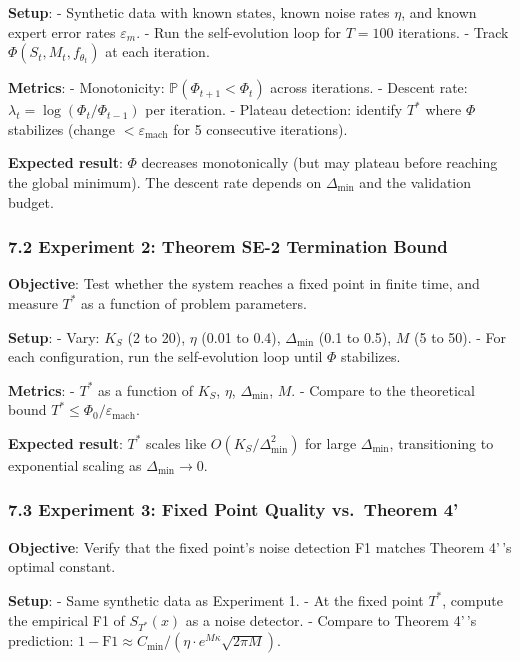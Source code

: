 \documentclass[
  12pt,
]{ctexart}
\begin{document}
\textbf{Setup}: - Synthetic data with known states, known noise rates
\(\eta\), and known expert error rates \(\varepsilon_m\). - Run the
self-evolution loop for \(T = 100\) iterations. - Track
\(\Phi(S_t, M_t, f_{\theta_t})\) at each iteration.

\textbf{Metrics}: - Monotonicity: \(\mathbb{P}(\Phi_{t+1} < \Phi_t)\)
across iterations. - Descent rate:
\(\lambda_t = \log(\Phi_t / \Phi_{t-1})\) per iteration. - Plateau
detection: identify \(T^*\) where \(\Phi\) stabilizes (change
\(< \varepsilon_{\text{mach}}\) for 5 consecutive iterations).

\textbf{Expected result}: \(\Phi\) decreases monotonically (but may
plateau before reaching the global minimum). The descent rate depends on
\(\Delta_{\min}\) and the validation budget.

\subsubsection{7.2 Experiment 2: Theorem SE-2 Termination
Bound}\label{experiment-2-theorem-se-2-termination-bound}

\textbf{Objective}: Test whether the system reaches a fixed point in
finite time, and measure \(T^*\) as a function of problem parameters.

\textbf{Setup}: - Vary: \(K_S\) (2 to 20), \(\eta\) (0.01 to 0.4),
\(\Delta_{\min}\) (0.1 to 0.5), \(M\) (5 to 50). - For each
configuration, run the self-evolution loop until \(\Phi\) stabilizes.

\textbf{Metrics}: - \(T^*\) as a function of \(K_S\), \(\eta\),
\(\Delta_{\min}\), \(M\). - Compare to the theoretical bound
\(T^* \leq \Phi_0/\varepsilon_{\text{mach}}\).

\textbf{Expected result}: \(T^*\) scales like \(O(K_S/\Delta_{\min}^2)\)
for large \(\Delta_{\min}\), transitioning to exponential scaling as
\(\Delta_{\min} \to 0\).

\subsubsection{7.3 Experiment 3: Fixed Point Quality vs.~Theorem
4'}\label{experiment-3-fixed-point-quality-vs.-theorem-4}

\textbf{Objective}: Verify that the fixed point's noise detection F1
matches Theorem 4'\,'s optimal constant.

\textbf{Setup}: - Same synthetic data as Experiment 1. - At the fixed
point \(T^*\), compute the empirical F1 of \(S_{T^*}(x)\) as a noise
detector. - Compare to Theorem 4'\,'s prediction:
\(1 - \text{F1} \approx C_{\min}/(\eta \cdot e^{M\kappa}\sqrt{2\pi M})\).
\end{document}
